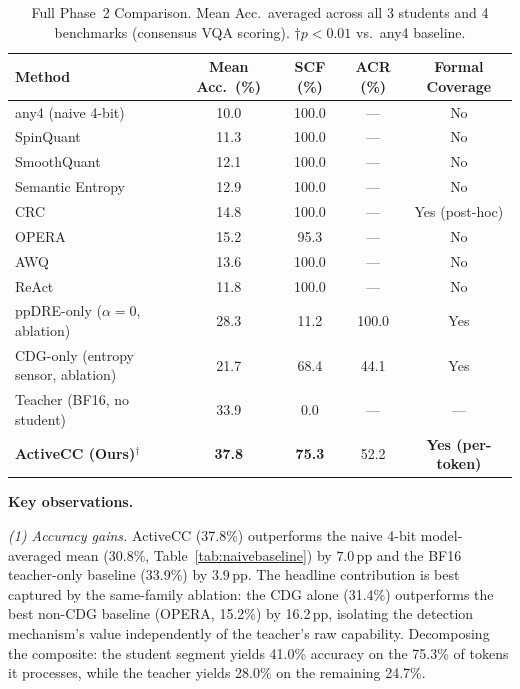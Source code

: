 \documentclass{ieeetmlcn}
\begin{document}
\begin{table}[t]
\caption{Full Phase~2 Comparison. Mean Acc.\ averaged across all 3
students and 4 benchmarks (consensus VQA scoring). $\dagger p<0.01$
vs.\ any4 baseline.}
\label{tab:baselines}
\centering
\begin{tabular}{lcccc}
\toprule
\textbf{Method} & \textbf{Mean Acc.\ (\%)} & \textbf{SCF (\%)} &
\textbf{ACR (\%)} & \textbf{Formal Coverage} \\
\midrule
any4 (naive 4-bit) \cite{elhoushi2025any}   & 10.0 & 100.0 & ---   & No \\
SpinQuant \cite{liu2025spinquant}            & 11.3 & 100.0 & ---   & No \\
SmoothQuant \cite{xiao2023smoothquant}       & 12.1 & 100.0 & ---   & No \\
Semantic Entropy      & 12.9 & 100.0 & ---   & No \\
CRC \cite{angelopoulos2024conformal}         & 14.8 & 100.0 & ---   & Yes (post-hoc) \\
OPERA                   & 15.2 &  95.3 & ---   & No \\
AWQ \cite{lin2024awq}                        & 13.6 & 100.0 & ---   & No \\
ReAct \cite{yao2022react}                    & 11.8 & 100.0 & ---   & No \\

ppDRE-only ($\alpha=0$, ablation)            & 28.3 &  11.2 & 100.0 & Yes \\
CDG-only (entropy sensor, ablation)          & 21.7 &  68.4 &  44.1 & Yes \\
Teacher (BF16, no student)                   & 33.9 &   0.0 & ---   & --- \\
\midrule
\textbf{ActiveCC (Ours)}$^\dagger$           & \textbf{37.8} & \textbf{75.3} & 52.2 & \textbf{Yes (per-token)} \\
\bottomrule
\end{tabular}
\end{table}

\noindent\textbf{Key observations.}

\noindent\emph{(1) Accuracy gains.} ActiveCC (37.8\%) outperforms the naive 4-bit model-averaged mean (30.8\%, Table~\ref{tab:naivebaseline}) by $7.0$\,pp and the BF16 teacher-only baseline (33.9\%) by $3.9$\,pp. The headline contribution is best captured by the same-family ablation: the CDG alone (31.4\%) outperforms the best non-CDG baseline (OPERA, 15.2\%) by 16.2\,pp, isolating the detection mechanism's value independently of the teacher's raw capability. Decomposing the composite: the student segment yields 41.0\% accuracy on the 75.3\% of tokens it processes, while the teacher yields 28.0\% on the remaining 24.7\%.
\end{document}
